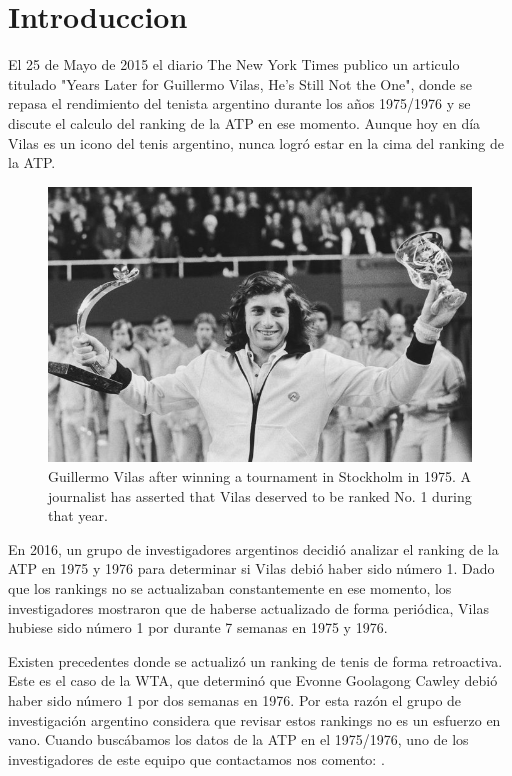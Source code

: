 \section{Introduccion}

El 25 de Mayo de 2015 el diario The New York Times publico un articulo titulado "Years Later for Guillermo Vilas, He’s Still Not the One", donde se repasa el rendimiento del tenista argentino durante los años 1975/1976 y se discute el calculo del ranking de la ATP en ese momento. Aunque hoy en día Vilas es un icono del tenis argentino, nunca logró estar en la cima del ranking de la ATP.

\begin{figure}[H]
  \centering
  \includegraphics[scale=6]{images/nyt}
  \caption{Guillermo Vilas after winning a tournament in Stockholm in 1975. A journalist has asserted that Vilas deserved to be ranked No. 1 during that year. }
\end{figure}

En 2016, un grupo de investigadores argentinos decidió analizar el ranking de la ATP en 1975 y 1976 para determinar si Vilas debió haber sido número 1. Dado que los rankings no se actualizaban constantemente en ese momento, los investigadores mostraron que de haberse actualizado de forma periódica, Vilas hubiese sido número 1 por durante 7 semanas en 1975 y 1976.

Existen precedentes donde se actualizó un ranking de tenis de forma retroactiva. Este es el caso de la WTA, que determinó que Evonne Goolagong Cawley debió haber sido número 1 por dos semanas en 1976. Por esta razón el grupo de investigación argentino considera que revisar estos rankings no es un esfuerzo en vano. Cuando buscábamos los datos de la ATP en el 1975/1976, uno de los investigadores de este equipo que contactamos nos comento: .

